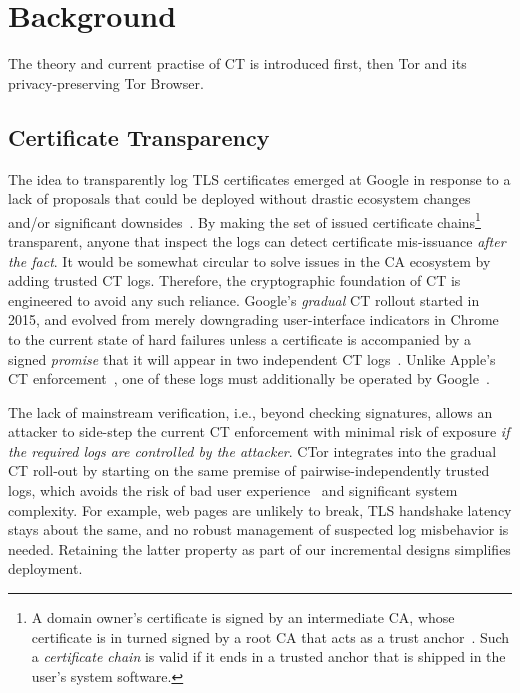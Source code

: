 \section{Background} \label{sec:background}
The theory and current practise of CT is introduced first, then Tor
and its privacy-preserving Tor Browser.

\subsection{Certificate Transparency} \label{sec:background:ct}
The idea to transparently log TLS certificates emerged at Google in response to
a lack of proposals that could be deployed without drastic ecosystem changes
and/or significant downsides~\cite{ct/a}.  By making the set of issued
certificate chains\footnote{%
	A domain owner's certificate is signed by an intermediate CA, whose
	certificate is in turned signed by a root CA that acts as a trust
	anchor~\cite{ca-ecosystem}.  Such a \emph{certificate chain} is valid if it
	ends in a trusted anchor that is shipped in the user's system software.
} transparent, anyone that inspect the logs can detect certificate
mis-issuance \emph{after the fact}.  It would be somewhat circular to solve
issues in the CA ecosystem by adding trusted CT logs.  Therefore, the
cryptographic foundation of CT is engineered to avoid any such reliance.
Google's \emph{gradual} CT rollout started in 2015, and evolved from merely
downgrading user-interface indicators in Chrome to the current state of hard
failures unless a certificate is accompanied by a signed \emph{promise} that it
will appear in two independent CT logs~\cite{does-ct-break-the-web}.  Unlike
Apple's CT enforcement~\cite{safari-policy}, one of these logs must additionally
be operated by Google~\cite{chrome-policy}.

The lack of mainstream verification, i.e., beyond checking signatures, allows an
attacker to side-step the current CT enforcement with minimal risk of exposure
\emph{if the required logs are controlled by the attacker}.  
CTor integrates into the gradual CT roll-out by starting on the same
premise of pairwise-independently trusted logs, which
avoids the risk of bad user experience~\cite{does-ct-break-the-web}
and significant system complexity.  For example, web pages are unlikely to
break, TLS handshake latency stays about the same, and no robust management of
suspected log misbehavior is needed.  Retaining the latter property as part of
our incremental designs simplifies deployment.

